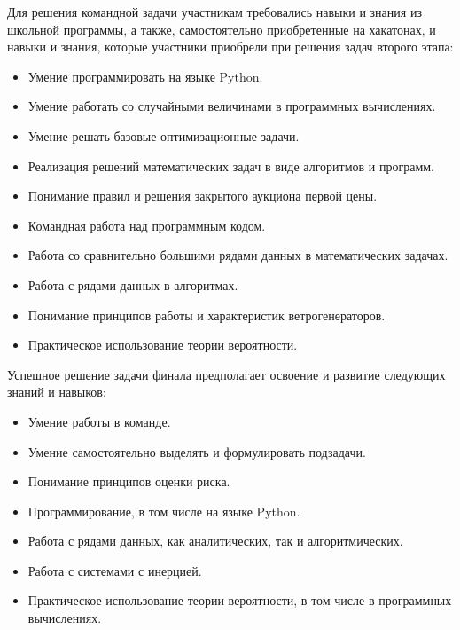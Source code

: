 Для решения командной задачи участникам требовались навыки и знания из школьной программы, а также, самостоятельно приобретенные на хакатонах, и навыки и знания, которые участники приобрели при решения задач второго этапа:
\begin{itemize}
\item Умение программировать на языке Python.
\item Умение работать со случайными величинами в программных вычислениях.
\item Умение решать базовые оптимизационные задачи.
\item Реализация решений математических задач в виде алгоритмов и программ.
\item Понимание правил и решения закрытого аукциона первой цены.
\item Командная работа над программным кодом.
\item Работа со сравнительно большими рядами данных в математических задачах.
\item Работа с рядами данных в алгоритмах.
\item Понимание принципов работы и характеристик ветрогенераторов.
\item Практическое использование теории вероятности.
\end{itemize}

Успешное решение задачи финала предполагает освоение и развитие следующих знаний и навыков:
\begin{itemize}
\item Умение работы в команде.
\item Умение самостоятельно выделять и формулировать подзадачи.
\item Понимание принципов оценки риска.
\item Программирование, в том числе на языке Python.
\item Работа с рядами данных, как аналитических, так и алгоритмических.
\item Работа с системами с инерцией.
\item Практическое использование теории вероятности, в том числе в программных вычислениях.
\end{itemize}

\clearpage
\endgroup
